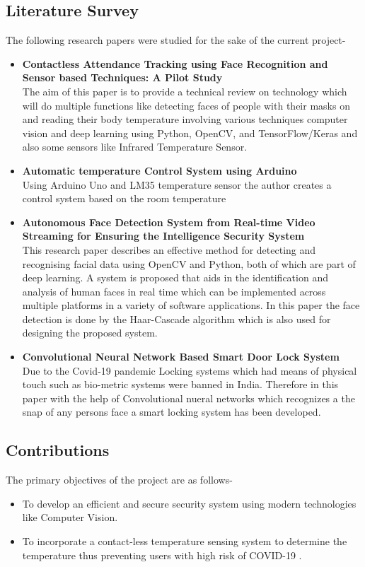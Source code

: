 \documentclass[conference]{IEEEtran}
\begin{document}
	\subsection{Literature Survey}
	The following research papers were studied for the sake of the current project-
	\begin{itemize}
		\item\textbf{Contactless Attendance Tracking using Face Recognition and Sensor based Techniques: A Pilot Study}\cite{2} \\The aim of this paper is to provide a technical review on technology which will do multiple functions like detecting faces of people with their masks on and reading their body temperature involving various techniques computer vision and deep learning using Python, OpenCV, and TensorFlow/Keras and also some sensors like Infrared Temperature Sensor.
		\item \textbf{Automatic temperature Control System using
			Arduino}\cite{3} \\Using Arduino Uno and LM35
		temperature sensor the author creates a control system based on the room temperature
		\item \textbf{Autonomous Face Detection System from Real-time Video Streaming for Ensuring the Intelligence Security System}\cite{4} \\This research paper describes an effective method for detecting and recognising facial data using OpenCV and Python, both of which are part of deep learning. A system is proposed that aids in the identification and analysis of human faces in real time which can be implemented across multiple platforms in a variety of software applications. In this paper the face detection  is done by the Haar-Cascade algorithm which is also used for designing the proposed system.
		
		\item \textbf{Convolutional Neural Network Based Smart Door Lock System}\cite{5}
		\\Due to the Covid-19 pandemic Locking systems which had means of physical touch such as bio-metric systems were banned in India. Therefore in this paper with the help of Convolutional nueral networks which recognizes a the snap of any persons face a smart locking system has been developed.
	\end{itemize}
	\subsection{Contributions}
	The primary objectives of the project are as follows-
	\begin{itemize}
		\item To develop an efficient and secure security system using modern technologies like Computer Vision. 
		\item To incorporate a contact-less temperature sensing system to determine
		the temperature thus preventing users with high risk of COVID-19 \cite{6}\cite{7}.
	\end{itemize}
\end{document}
